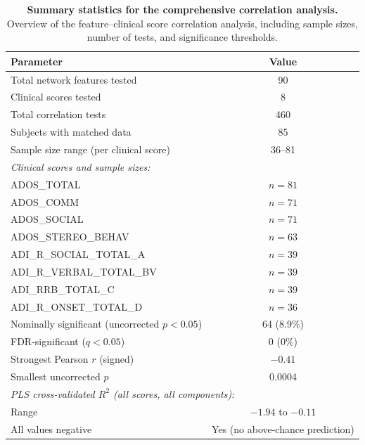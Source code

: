 \documentclass[10pt,letterpaper]{article}
\begin{document}
\begin{table}[htbp]
\centering
\caption{\textbf{Summary statistics for the comprehensive correlation analysis.} Overview of the
feature--clinical score correlation analysis, including sample sizes, number of tests, and
significance thresholds.}
\label{tab:supp_corr_full}
\small
\begin{tabular}{lc}
\toprule
\textbf{Parameter} & \textbf{Value} \\
\midrule
Total network features tested & 90 \\
Clinical scores tested & 8 \\
Total correlation tests & 460 \\
Subjects with matched data & 85 \\
Sample size range (per clinical score) & 36--81 \\
\midrule
\multicolumn{2}{l}{\textit{Clinical scores and sample sizes:}} \\
\quad ADOS\_TOTAL & $n = 81$ \\
\quad ADOS\_COMM & $n = 71$ \\
\quad ADOS\_SOCIAL & $n = 71$ \\
\quad ADOS\_STEREO\_BEHAV & $n = 63$ \\
\quad ADI\_R\_SOCIAL\_TOTAL\_A & $n = 39$ \\
\quad ADI\_R\_VERBAL\_TOTAL\_BV & $n = 39$ \\
\quad ADI\_RRB\_TOTAL\_C & $n = 39$ \\
\quad ADI\_R\_ONSET\_TOTAL\_D & $n = 36$ \\
\midrule
Nominally significant (uncorrected $p < 0.05$) & 64 (8.9\%) \\
FDR-significant ($q < 0.05$) & 0 (0\%) \\
Strongest Pearson $r$ (signed) & $-0.41$ \\
Smallest uncorrected $p$ & 0.0004 \\
\midrule
\multicolumn{2}{l}{\textit{PLS cross-validated $R^2$ (all scores, all components):}} \\
\quad Range & $-1.94$ to $-0.11$ \\
\quad All values negative & Yes (no above-chance prediction) \\
\bottomrule
\end{tabular}
\end{table}
\end{document}
